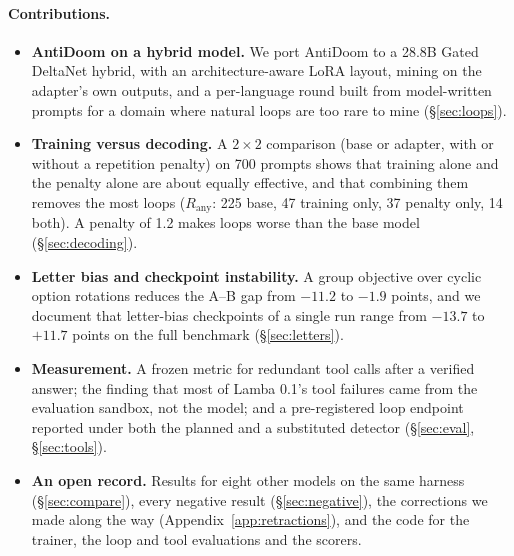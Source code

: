 \documentclass[11pt]{article}
\newcommand{\Rany}{R_{\text{any}}}
\begin{document}
\paragraph{Contributions.}
\begin{itemize}
  \item \textbf{AntiDoom on a hybrid model.} We port AntiDoom to a 28.8B Gated DeltaNet hybrid, with an architecture-aware LoRA layout, mining on the adapter's own outputs, and a per-language round built from model-written prompts for a domain where natural loops are too rare to mine (\S\ref{sec:loops}).
  \item \textbf{Training versus decoding.} A $2\times2$ comparison (base or adapter, with or without a repetition penalty) on 700 prompts shows that training alone and the penalty alone are about equally effective, and that combining them removes the most loops ($\Rany$: 225 base, 47 training only, 37 penalty only, 14 both). A penalty of 1.2 makes loops worse than the base model (\S\ref{sec:decoding}).
  \item \textbf{Letter bias and checkpoint instability.} A group objective over cyclic option rotations reduces the A--B gap from $-11.2$ to $-1.9$ points, and we document that letter-bias checkpoints of a single run range from $-13.7$ to $+11.7$ points on the full benchmark (\S\ref{sec:letters}).
  \item \textbf{Measurement.} A frozen metric for redundant tool calls after a verified answer; the finding that most of Lamba 0.1's tool failures came from the evaluation sandbox, not the model; and a pre-registered loop endpoint reported under both the planned and a substituted detector (\S\ref{sec:eval}, \S\ref{sec:tools}).
  \item \textbf{An open record.} Results for eight other models on the same harness (\S\ref{sec:compare}), every negative result (\S\ref{sec:negative}), the corrections we made along the way (Appendix~\ref{app:retractions}), and the code for the trainer, the loop and tool evaluations and the scorers.
\end{itemize}
\end{document}
